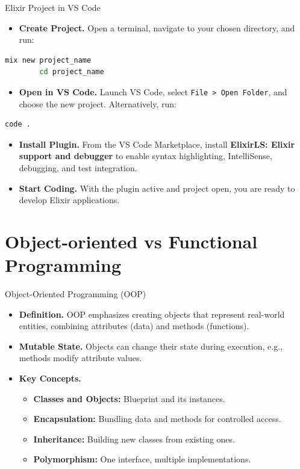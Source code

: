 \documentclass[aspectratio=169, table]{beamer}
\begin{document}
\begin{frame}[fragile]{Elixir Project in VS Code}
	\vspace{20pt}
	\begin{itemize}
		\item \textbf{Create Project.} Open a terminal, navigate to your chosen directory, and run:
	\end{itemize}
	
	\begin{lstlisting}[language=bash]
		mix new project_name
		cd project_name
	\end{lstlisting}
	
	\begin{itemize}
		\item \textbf{Open in VS Code.} Launch VS Code, select \texttt{File > Open Folder}, and choose the new project. Alternatively, run:
	\end{itemize}
	
	\begin{lstlisting}[language=bash]
		code .
	\end{lstlisting}
	
	\begin{itemize}
		\item \textbf{Install Plugin.} From the VS Code Marketplace, install \textbf{ElixirLS: Elixir support and debugger} to enable syntax highlighting, IntelliSense, debugging, and test integration.
		\item \textbf{Start Coding.} With the plugin active and project open, you are ready to develop Elixir applications.
	\end{itemize}
\end{frame}


\section{Object-oriented vs Functional Programming}

\begin{frame}{Object-Oriented Programming (OOP)}
	\vspace{20pt}
	\begin{itemize}
		\item \textbf{Definition.} OOP emphasizes creating objects that represent real-world entities, combining attributes (data) and methods (functions).  
		\item \textbf{Mutable State.} Objects can change their state during execution, e.g., methods modify attribute values.  
		\item \textbf{Key Concepts.}
		\begin{itemize}
			\item \textbf{Classes and Objects:} Blueprint and its instances.  
			\item \textbf{Encapsulation:} Bundling data and methods for controlled access.  
			\item \textbf{Inheritance:} Building new classes from existing ones.  
			\item \textbf{Polymorphism:} One interface, multiple implementations.  
		\end{itemize}
	\end{itemize}
\end{frame}
\end{document}
